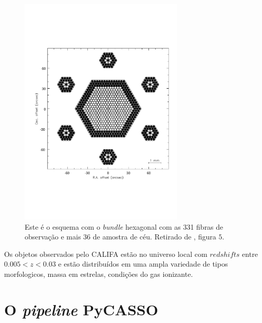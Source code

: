 \begin{figure}
    \includegraphics[width=0.7\textwidth]{figuras/Fig5.pdf}
    \caption[{\em Layout} do {\em bundle} de fibras do PPMAS/PPAK.]
    {Este é o esquema com o {\em bundle} hexagonal com as 331 fibras de
    observação e mais 36 de amostra de céu. Retirado de \citet{Verheijen2004},
    figura $5$.}
    \label{fig:BundlePPAK}
\end{figure}

Os objetos observados pelo CALIFA estão no universo local com $redshifts$ entre
$0.005 < z < 0.03$ e estão distribuídos em uma ampla variedade de tipos
morfologicos, massa em estrelas, condições do gas ionizante.


\section{O {\em pipeline} PyCASSO}
\label{sec:CALePyC:PyCASSO}

